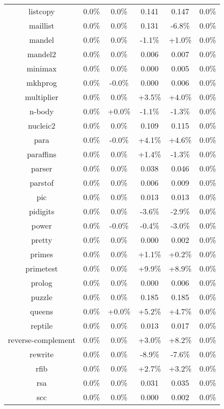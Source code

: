 \begin{tabular}{ c c c c c c }
listcopy &  0.0\% &  0.0\% & 0.141 & 0.147 &  0.0\%\\
maillist &  0.0\% &  0.0\% & 0.131 & -6.8\% &  0.0\%\\
mandel &  0.0\% &  0.0\% & -1.1\% & +1.0\% &  0.0\%\\
mandel2 &  0.0\% &  0.0\% & 0.006 & 0.007 &  0.0\%\\
minimax &  0.0\% &  0.0\% & 0.000 & 0.005 &  0.0\%\\
mkhprog &  0.0\% & -0.0\% & 0.000 & 0.006 &  0.0\%\\
multiplier &  0.0\% &  0.0\% & +3.5\% & +4.0\% &  0.0\%\\
n-body &  0.0\% & +0.0\% & -1.1\% & -1.3\% &  0.0\%\\
nucleic2 &  0.0\% &  0.0\% & 0.109 & 0.115 &  0.0\%\\
para &  0.0\% & -0.0\% & +4.1\% & +4.6\% &  0.0\%\\
paraffins &  0.0\% &  0.0\% & +1.4\% & -1.3\% &  0.0\%\\
parser &  0.0\% &  0.0\% & 0.038 & 0.046 &  0.0\%\\
parstof &  0.0\% &  0.0\% & 0.006 & 0.009 &  0.0\%\\
pic &  0.0\% &  0.0\% & 0.013 & 0.013 &  0.0\%\\
pidigits &  0.0\% &  0.0\% & -3.6\% & -2.9\% &  0.0\%\\
power &  0.0\% & -0.0\% & -0.4\% & -3.0\% &  0.0\%\\
pretty &  0.0\% &  0.0\% & 0.000 & 0.002 &  0.0\%\\
primes &  0.0\% &  0.0\% & +1.1\% & +0.2\% &  0.0\%\\
primetest &  0.0\% &  0.0\% & +9.9\% & +8.9\% &  0.0\%\\
prolog &  0.0\% &  0.0\% & 0.000 & 0.006 &  0.0\%\\
puzzle &  0.0\% &  0.0\% & 0.185 & 0.185 &  0.0\%\\
queens &  0.0\% & +0.0\% & +5.2\% & +4.7\% &  0.0\%\\
reptile &  0.0\% &  0.0\% & 0.013 & 0.017 &  0.0\%\\
reverse-complement &  0.0\% &  0.0\% & +3.0\% & +8.2\% &  0.0\%\\
rewrite &  0.0\% &  0.0\% & -8.9\% & -7.6\% &  0.0\%\\
rfib &  0.0\% &  0.0\% & +2.7\% & +3.2\% &  0.0\%\\
rsa &  0.0\% &  0.0\% & 0.031 & 0.035 &  0.0\%\\
scc &  0.0\% &  0.0\% & 0.000 & 0.002 &  0.0\%\\

\end{tabular}
